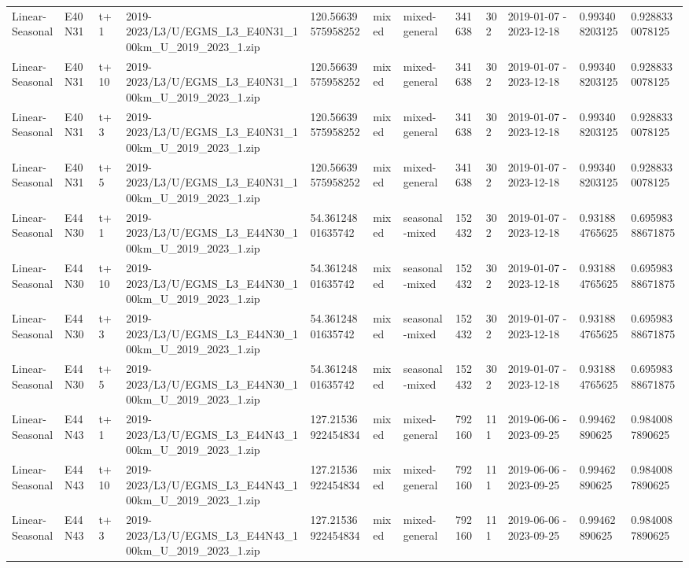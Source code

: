 \begin{landscape}
\begin{longtable}{llllllllllll}
Linear-Seasonal & E40N31 & t+1 & 2019-2023/L3/U/EGMS\_L3\_E40N31\_100km\_U\_2019\_2023\_1.zip & 120.56639575958252 & mixed & mixed-general & 341638 & 302 & 2019-01-07 - 2023-12-18 & 0.993408203125 & 0.9288330078125 \\
Linear-Seasonal & E40N31 & t+10 & 2019-2023/L3/U/EGMS\_L3\_E40N31\_100km\_U\_2019\_2023\_1.zip & 120.56639575958252 & mixed & mixed-general & 341638 & 302 & 2019-01-07 - 2023-12-18 & 0.993408203125 & 0.9288330078125 \\
Linear-Seasonal & E40N31 & t+3 & 2019-2023/L3/U/EGMS\_L3\_E40N31\_100km\_U\_2019\_2023\_1.zip & 120.56639575958252 & mixed & mixed-general & 341638 & 302 & 2019-01-07 - 2023-12-18 & 0.993408203125 & 0.9288330078125 \\
Linear-Seasonal & E40N31 & t+5 & 2019-2023/L3/U/EGMS\_L3\_E40N31\_100km\_U\_2019\_2023\_1.zip & 120.56639575958252 & mixed & mixed-general & 341638 & 302 & 2019-01-07 - 2023-12-18 & 0.993408203125 & 0.9288330078125 \\
Linear-Seasonal & E44N30 & t+1 & 2019-2023/L3/U/EGMS\_L3\_E44N30\_100km\_U\_2019\_2023\_1.zip & 54.36124801635742 & mixed & seasonal-mixed & 152432 & 302 & 2019-01-07 - 2023-12-18 & 0.931884765625 & 0.69598388671875 \\
Linear-Seasonal & E44N30 & t+10 & 2019-2023/L3/U/EGMS\_L3\_E44N30\_100km\_U\_2019\_2023\_1.zip & 54.36124801635742 & mixed & seasonal-mixed & 152432 & 302 & 2019-01-07 - 2023-12-18 & 0.931884765625 & 0.69598388671875 \\
Linear-Seasonal & E44N30 & t+3 & 2019-2023/L3/U/EGMS\_L3\_E44N30\_100km\_U\_2019\_2023\_1.zip & 54.36124801635742 & mixed & seasonal-mixed & 152432 & 302 & 2019-01-07 - 2023-12-18 & 0.931884765625 & 0.69598388671875 \\
Linear-Seasonal & E44N30 & t+5 & 2019-2023/L3/U/EGMS\_L3\_E44N30\_100km\_U\_2019\_2023\_1.zip & 54.36124801635742 & mixed & seasonal-mixed & 152432 & 302 & 2019-01-07 - 2023-12-18 & 0.931884765625 & 0.69598388671875 \\
Linear-Seasonal & E44N43 & t+1 & 2019-2023/L3/U/EGMS\_L3\_E44N43\_100km\_U\_2019\_2023\_1.zip & 127.21536922454834 & mixed & mixed-general & 792160 & 111 & 2019-06-06 - 2023-09-25 & 0.99462890625 & 0.9840087890625 \\
Linear-Seasonal & E44N43 & t+10 & 2019-2023/L3/U/EGMS\_L3\_E44N43\_100km\_U\_2019\_2023\_1.zip & 127.21536922454834 & mixed & mixed-general & 792160 & 111 & 2019-06-06 - 2023-09-25 & 0.99462890625 & 0.9840087890625 \\
Linear-Seasonal & E44N43 & t+3 & 2019-2023/L3/U/EGMS\_L3\_E44N43\_100km\_U\_2019\_2023\_1.zip & 127.21536922454834 & mixed & mixed-general & 792160 & 111 & 2019-06-06 - 2023-09-25 & 0.99462890625 & 0.9840087890625 \\

\end{longtable}
\end{landscape}
